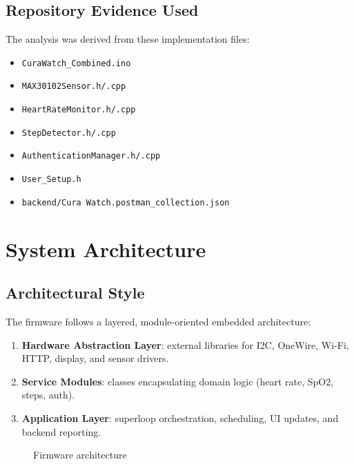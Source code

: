 \documentclass[12pt,a4paper]{report}
\begin{document}
\subsection{Repository Evidence Used}
The analysis was derived from these implementation files:
\begin{itemize}
  \item \texttt{CuraWatch\_Combined.ino}
  \item \texttt{MAX30102Sensor.h/.cpp}
  \item \texttt{HeartRateMonitor.h/.cpp}
  \item \texttt{StepDetector.h/.cpp}
  \item \texttt{AuthenticationManager.h/.cpp}
  \item \texttt{User\_Setup.h}
  \item \texttt{backend/Cura Watch.postman\_collection.json}
\end{itemize}

\section{System Architecture}
\subsection{Architectural Style}
The firmware follows a layered, module-oriented embedded architecture:
\begin{enumerate}
  \item \textbf{Hardware Abstraction Layer}: external libraries for I2C, OneWire, Wi-Fi, HTTP, display, and sensor drivers.
  \item \textbf{Service Modules}: classes encapsulating domain logic (heart rate, SpO2, steps, auth).
  \item \textbf{Application Layer}: superloop orchestration, scheduling, UI updates, and backend reporting.
\end{enumerate}

\begin{figure}[H]
\centering
{}
\caption{Firmware architecture}
\label{fig:firmware-architecture}
\end{figure}
\end{document}
